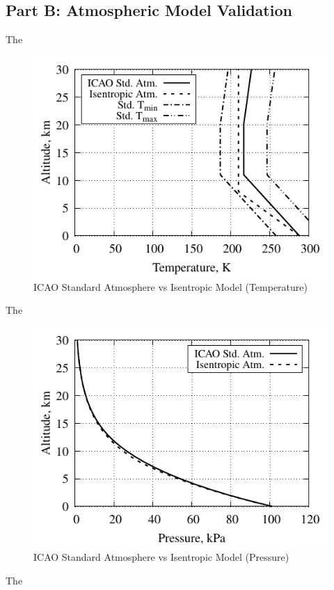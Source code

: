 \documentclass[conf]{new-aiaa} %
\begin{document}
\subsection{Part B: Atmospheric Model Validation}
The

\begin{figure}[hbt!] %
    \centering
    \includegraphics[]{media/atmosphere_validation_files/ICAO_vs_ISEN_temperature.pdf}
    \caption{\label{fig:partbtemp}ICAO Standard Atmosphere vs Isentropic Model (Temperature)}
\end{figure}
The

\begin{figure}[hbt!] %
    \centering
    \includegraphics[]{media/atmosphere_validation_files/ICAO_vs_ISEN_pressure.pdf}
    \caption{\label{fig:partbpres}ICAO Standard Atmosphere vs Isentropic Model (Pressure)}
\end{figure}
The
\end{document}
